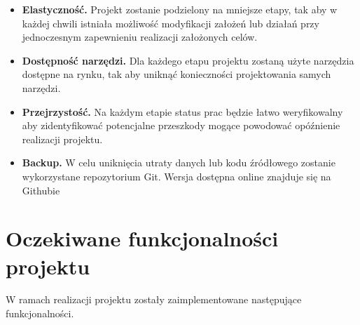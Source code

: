 \documentclass[a4paper,12pt,reqno]{article}
\begin{document}
\begin{itemize}
	\item \textbf{Elastyczność.} Projekt zostanie podzielony na mniejsze etapy, tak aby w każdej chwili istniała możliwość modyfikacji założeń lub działań przy jednoczesnym zapewnieniu realizacji założonych celów.
	\item \textbf{Dostępność narzędzi.} Dla każdego etapu projektu zostaną użyte narzędzia dostępne na rynku, tak aby uniknąć konieczności projektowania samych narzędzi.
	\item \textbf{Przejrzystość.} Na każdym etapie status prac będzie łatwo weryfikowalny aby zidentyfikować potencjalne przeszkody mogące powodować opóźnienie realizacji projektu.
	\item \textbf{Backup.} W celu uniknięcia utraty danych \textcolor{edited}{lub kodu źródłowego} zostanie wykorzystane repozytorium Git. \textcolor{edited}{Wersja dostępna online znajduje się na Githubie}
\end{itemize}

\newpage
\section{Oczekiwane funkcjonalności projektu} \label{section:oczekiwania}

W ramach realizacji projektu zostały zaimplementowane następujące funkcjonalności.
\end{document}
